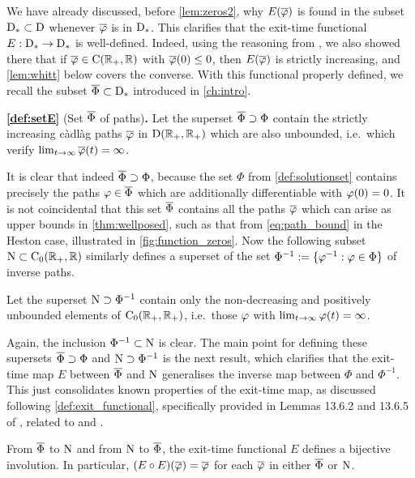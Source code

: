 We have already discussed, before \autoref{lem:zeros2}, why $E(\overline{\varphi})$ is found in the subset $\mathrm{D}_*\subset\mathrm{D}$ whenever $\overline{\varphi}$ is in $\mathrm{D}_*$. This clarifies that the exit-time functional $E:\mathrm{D}_*\to\mathrm{D}_*$ is well-defined. Indeed, using the reasoning from \cite{whitt_2002}, we also showed there that if $\overline{\varphi}\in\mathrm{C}(\mathbb{R}_+,\mathbb{R})$ with $\overline{\varphi}(0)\le 0$, then $E(\overline{\varphi})$ is strictly increasing, and \autoref{lem:whitt} below covers the converse. With this functional properly defined, we recall the subset $\overline{\Phi}\subset\mathrm{D}_*$ introduced in \autoref{ch:intro}.

\textbf{\autoref{def:setE}} (Set $\overline{\Phi}$ of paths)\textbf{.}
    Let the superset $\overline{\Phi}\supset\Phi$ contain the strictly increasing c\`adl\`ag paths $\overline{\varphi}$ in $\mathrm{D}(\mathbb{R}_+,\mathbb{R}_+)$ which are also unbounded, i.e.~which verify $\lim_{t\to\infty}\overline{\varphi}(t)=\infty$.

It is clear that indeed $\overline{\Phi}\supset\Phi$, because the set $\Phi$ from \autoref{def:solutionset} contains precisely the paths $\varphi\in\overline{\Phi}$ which are additionally differentiable with $\varphi(0)=0$. It is not coincidental that this set $\overline{\Phi}$ contains all the paths $\overline{\varphi}$ which can arise as upper bounds in \autoref{thm:wellposed}, such as that from \autoref{eq:path_bound} in the Heston case, illustrated in \autoref{fig:function_zeros}. Now the following subset $\mathrm{N}\subset\mathrm{C}_0(\mathbb{R}_+,\mathbb{R})$ similarly defines a superset of the set $\Phi^{-1}:=\{\varphi^{-1}:\varphi\in\Phi\}$ of inverse paths.

\begin{definition}\label{def:setN}
    $\!$Let the superset $\mathrm{N}\supset\Phi^{-1}$ contain only the non-decreasing and positively unbounded elements of $\mathrm{C}_0(\mathbb{R}_+,\mathbb{R}_+)$, i.e.~those $\varphi$ with $\lim_{t\to\infty}\varphi(t)=\infty$.
\end{definition}

Again, the inclusion $\Phi^{-1}\subset\mathrm{N}$ is clear. The main point for defining these supersets $\overline{\Phi}\supset\Phi$ and $\mathrm{N}\supset\Phi^{-1}$ is the next result, which clarifies that the exit-time map $E$ between $\overline{\Phi}$ and $\mathrm{N}$ generalises the inverse map between $\Phi$ and $\Phi^{-1}$. This just consolidates known properties of the exit-time map, as discussed following \autoref{def:exit_functional}, specifically provided in Lemmas 13.6.2 and 13.6.5 of \cite{whitt_2002}, related to \cite{whitt_1971} and \cite{puhalskii_1997}.

\begin{lemma}\label{lem:whitt}
    From $\overline{\Phi}$ to $\mathrm{N}$ and from $\mathrm{N}$ to $\overline{\Phi}$, the exit-time functional $E$ defines a bijective involution. In particular, $(E\circ E)(\overline{\varphi})=\overline{\varphi}$ for each $\overline{\varphi}$ in either $\overline{\Phi}$ or $\mathrm{N}$.
\end{lemma}


